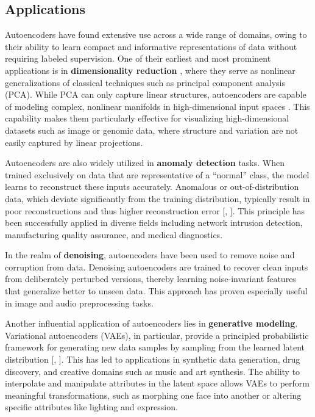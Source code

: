 \subsection{Applications}

Autoencoders have found extensive use across a wide range of domains, owing to their ability to learn compact and informative representations of data without requiring labeled supervision. One of their earliest and most prominent applications is in \textbf{dimensionality reduction} \cite{Goodfellow16}, where they serve as nonlinear generalizations of classical techniques such as principal component analysis (PCA). While PCA can only capture linear structures, autoencoders are capable of modeling complex, nonlinear manifolds in high-dimensional input spaces \cite{Hinton06}. This capability makes them particularly effective for visualizing high-dimensional datasets such as image or genomic data, where structure and variation are not easily captured by linear projections.

Autoencoders are also widely utilized in \textbf{anomaly detection} tasks. When trained exclusively on data that are representative of a “normal” class, the model learns to reconstruct these inputs accurately. Anomalous or out-of-distribution data, which deviate significantly from the training distribution, typically result in poor reconstructions and thus higher reconstruction error [\cite{Sakurada14}, \cite{Bank21}]. This principle has been successfully applied in diverse fields including network intrusion detection, manufacturing quality assurance, and medical diagnostics.

In the realm of \textbf{denoising}, autoencoders have been used to remove noise and corruption from data. Denoising autoencoders \cite{Vincent08} are trained to recover clean inputs from deliberately perturbed versions, thereby learning noise-invariant features that generalize better to unseen data. This approach has proven especially useful in image and audio preprocessing tasks.

Another influential application of autoencoders lies in \textbf{generative modeling}. Variational autoencoders (VAEs), in particular, provide a principled probabilistic framework for generating new data samples by sampling from the learned latent distribution [\cite{Kingma13}, \cite{Bank21}]. This has led to applications in synthetic data generation, drug discovery, and creative domains such as music and art synthesis. The ability to interpolate and manipulate attributes in the latent space allows VAEs to perform meaningful transformations, such as morphing one face into another or altering specific attributes like lighting and expression.

